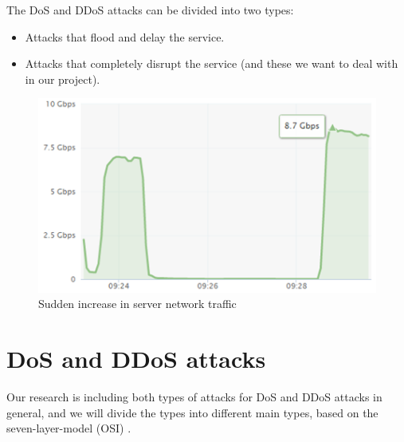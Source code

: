 \documentclass{report}
\begin{document}
\hfill \break The \gls{DoS} and \gls{DDoS} attacks can be divided into two types: 
\begin{itemize}
\item 	Attacks that flood and delay the service.
\item	Attacks that completely disrupt the service (and these we want to deal with in our project).

\end{itemize}
\begin{figure}
  \centering
        \includegraphics{ddos-attack-traffic-gbps}
	\caption{Sudden increase in server network traffic}
    \end{figure}

\section{DoS and DDoS attacks}
Our research is including both types of attacks for \gls{DoS} and \gls{DDoS} attacks in general, and we will divide the types into different main types, based on the seven-layer-model (\gls{OSI}) \cite{QuickGuide}.
\end{document}
